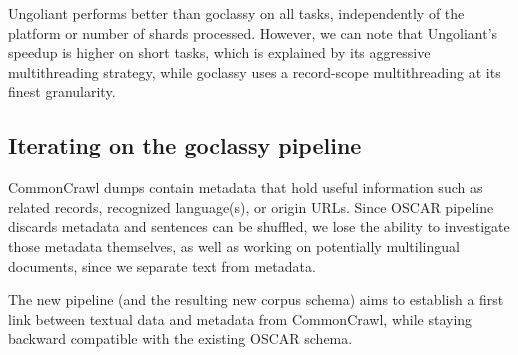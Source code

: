 \begin{table}[t]
    \centering\small
    \caption{Comparison of approximate generation times depending on platform and number of shards.}
    \label{tab:goclassy-bench}
\end{table}

Ungoliant performs better than goclassy on all tasks, independently of the platform or number of shards processed. However, we can note that Ungoliant's speedup is higher on short tasks, which is explained by its aggressive multithreading strategy, while goclassy uses a record-scope multithreading at its finest granularity.


\subsection{Iterating on the goclassy pipeline}


CommonCrawl dumps contain metadata that hold useful information such as related records, recognized language(s), or origin URLs. Since OSCAR pipeline discards metadata and sentences can be shuffled, we lose the ability to investigate those metadata themselves, as well as working on potentially multilingual documents, since we separate text from metadata.

The new pipeline (and the resulting new corpus schema) aims to establish a first link between textual data and metadata from CommonCrawl, while staying backward compatible with the existing OSCAR schema.

